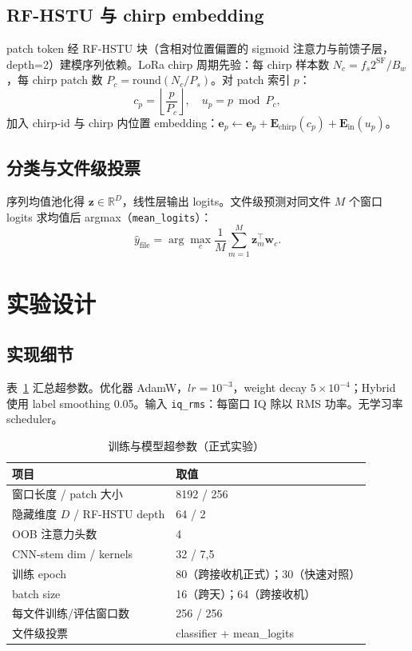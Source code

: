 \documentclass[journal]{IEEEtran}
\begin{document}
\subsection{RF-HSTU 与 chirp embedding}
patch token 经 RF-HSTU 块（含相对位置偏置的 sigmoid 注意力与前馈子层，depth=2）建模序列依赖。LoRa chirp 周期先验：每 chirp 样本数 $N_c=f_s 2^{\mathrm{SF}}/B_w$，每 chirp patch 数 $P_c=\mathrm{round}(N_c/P_s)$。对 patch 索引 $p$：
\begin{equation}
  c_p = \left\lfloor \frac{p}{P_c} \right\rfloor,\quad
  u_p = p \bmod P_c,
\end{equation}
加入 chirp-id 与 chirp 内位置 embedding：$\mathbf{e}_p \leftarrow \mathbf{e}_p + \mathbf{E}_{\mathrm{chirp}}(c_p)+\mathbf{E}_{\mathrm{in}}(u_p)$。

\subsection{分类与文件级投票}
序列均值池化得 $\mathbf{z}\in\mathbb{R}^D$，线性层输出 logits。文件级预测对同文件 $M$ 个窗口 logits 求均值后 argmax（\texttt{mean\_logits}）：
\begin{equation}
  \hat{y}_{\mathrm{file}} = \arg\max_c \frac{1}{M}\sum_{m=1}^{M} \mathbf{z}_{m}^\top \mathbf{w}_c.
\end{equation}

\section{实验设计}

\subsection{实现细节}
表~\ref{tab:hyper} 汇总超参数。优化器 AdamW，$lr=10^{-3}$，weight decay $5\times10^{-4}$；Hybrid 使用 label smoothing 0.05。输入 \texttt{iq\_rms}：每窗口 IQ 除以 RMS 功率。无学习率 scheduler。

\begin{table}[!t]
\caption{训练与模型超参数（正式实验）}
\label{tab:hyper}
\centering
\renewcommand{\arraystretch}{1.15}
\begin{tabular}{ll}
\toprule
\textbf{项目} & \textbf{取值} \\
\midrule
窗口长度 / patch 大小 & 8192 / 256 \\
隐藏维度 $D$ / RF-HSTU depth & 64 / 2 \\
OOB 注意力头数 & 4 \\
CNN-stem dim / kernels & 32 / 7,5 \\
训练 epoch & 80（跨接收机正式）；30（快速对照） \\
batch size & 16（跨天）；64（跨接收机） \\
每文件训练/评估窗口数 & 256 / 256 \\
文件级投票 & classifier + mean\_logits \\
\bottomrule
\end{tabular}
\end{table}
\end{document}
